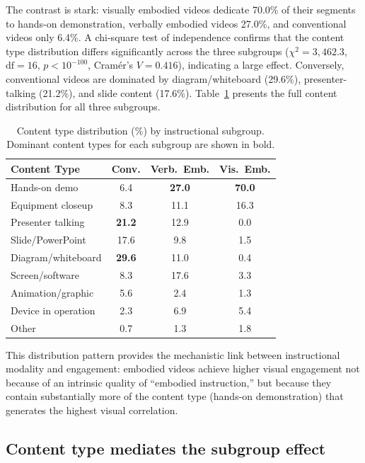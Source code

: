 \documentclass[fleqn,10pt]{wlscirep}
\begin{document}
The contrast is stark: visually embodied videos dedicate 70.0\% of their segments to hands-on demonstration, verbally embodied videos 27.0\%, and conventional videos only 6.4\%. A chi-square test of independence confirms that the content type distribution differs significantly across the three subgroups ($\chi^2 = 3{,}462.3$, $\text{df} = 16$, $p < 10^{-100}$, Cram\'{e}r's $V = 0.416$), indicating a large effect. Conversely, conventional videos are dominated by diagram/whiteboard (29.6\%), presenter-talking (21.2\%), and slide content (17.6\%). Table~\ref{tab:content_dist} presents the full content distribution for all three subgroups.

\begin{table}[ht]
    \centering
    \caption{Content type distribution (\%) by instructional subgroup. Dominant content types for each subgroup are shown in bold.}
    \label{tab:content_dist}
    \begin{tabular}{lccc}
        \toprule
        Content Type & Conv. & Verb.\ Emb. & Vis.\ Emb. \\
        \midrule
        Hands-on demo & 6.4 & \textbf{27.0} & \textbf{70.0} \\
        Equipment closeup & 8.3 & 11.1 & 16.3 \\
        Presenter talking & \textbf{21.2} & 12.9 & 0.0 \\
        Slide/PowerPoint & 17.6 & 9.8 & 1.5 \\
        Diagram/whiteboard & \textbf{29.6} & 11.0 & 0.4 \\
        Screen/software & 8.3 & 17.6 & 3.3 \\
        Animation/graphic & 5.6 & 2.4 & 1.3 \\
        Device in operation & 2.3 & 6.9 & 5.4 \\
        Other & 0.7 & 1.3 & 1.8 \\
        \bottomrule
    \end{tabular}
\end{table}

This distribution pattern provides the mechanistic link between instructional modality and engagement: embodied videos achieve higher visual engagement not because of an intrinsic quality of ``embodied instruction,'' but because they contain substantially more of the content type (hands-on demonstration) that generates the highest visual correlation.


\subsection*{Content type mediates the subgroup effect}
\end{document}
